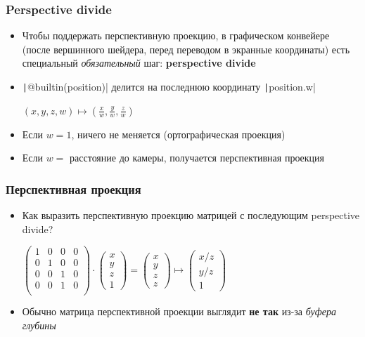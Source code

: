 \documentclass[10pt]{beamer}
\begin{document}
\begin{frame}[fragile]
\frametitle{Perspective divide}
\begin{itemize}
\item Чтобы поддержать перспективную проекцию, в графическом конвейере (после вершинного шейдера, перед переводом в экранные координаты) есть специальный \textit{обязательный} шаг: \textbf{perspective divide}
\pause
\item \texttt|@builtin(position)| делится на последнюю координату \texttt|position.w|
\begin{center}
\begin{math}
(x, y, z, w) \mapsto \left(\frac{x}{w}, \frac{y}{w}, \frac{z}{w}\right)
\end{math}
\end{center}
\pause
\item Если \begin{math}w=1\end{math}, ничего не меняется (ортографическая проекция)
\pause
\item Если \begin{math}w=\end{math} расстояние до камеры, получается перспективная проекция
\end{itemize}
\end{frame}

\begin{frame}[fragile]
\frametitle{Перспективная проекция}
\begin{itemize}
\item Как выразить перспективную проекцию матрицей с последующим perspective divide?
\pause
\begin{center}
\begin{math}
\begin{pmatrix}
1 & 0 & 0 & 0 \\
0 & 1 & 0 & 0 \\
0 & 0 & 1 & 0 \\
0 & 0 & 1 & 0 \\
\end{pmatrix}
\cdot
\begin{pmatrix}
x \\ y \\ z \\ 1
\end{pmatrix}
=
\begin{pmatrix}
x \\ y \\ z \\ z
\end{pmatrix}
\mapsto
\begin{pmatrix}
x/z \\ y/z \\ 1
\end{pmatrix}
\end{math}
\end{center}
\pause
\item Обычно матрица перспективной проекции выглядит \textbf{\alert{не так}} из-за \textit{буфера глубины}
\end{itemize}
\end{frame}
\end{document}
